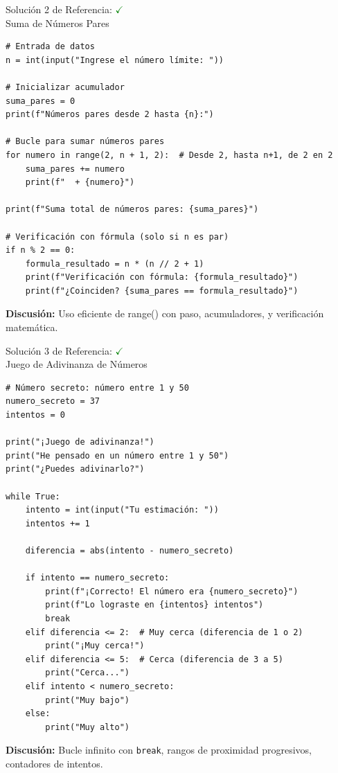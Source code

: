 \documentclass[10pt]{beamer}
\begin{document}
\begin{frame}[fragile]{Solución 2 de Referencia: \hfill \textcolor{green}{$\checkmark$} \\ Suma de Números Pares}
\begin{verbatim}
# Entrada de datos
n = int(input("Ingrese el número límite: "))

# Inicializar acumulador
suma_pares = 0
print(f"Números pares desde 2 hasta {n}:")

# Bucle para sumar números pares
for numero in range(2, n + 1, 2):  # Desde 2, hasta n+1, de 2 en 2
    suma_pares += numero
    print(f"  + {numero}")

print(f"Suma total de números pares: {suma_pares}")

# Verificación con fórmula (solo si n es par)
if n % 2 == 0:
    formula_resultado = n * (n // 2 + 1)
    print(f"Verificación con fórmula: {formula_resultado}")
    print(f"¿Coinciden? {suma_pares == formula_resultado}")
\end{verbatim}
\textbf{Discusión:} Uso eficiente de range() con paso, acumuladores, y verificación matemática.
\end{frame}

\begin{frame}[fragile]{Solución 3 de Referencia: \hfill \textcolor{green}{$\checkmark$} \\ Juego de Adivinanza de Números}
\begin{verbatim}
# Número secreto: número entre 1 y 50
numero_secreto = 37
intentos = 0

print("¡Juego de adivinanza!")
print("He pensado en un número entre 1 y 50")
print("¿Puedes adivinarlo?")

while True:
    intento = int(input("Tu estimación: "))
    intentos += 1

    diferencia = abs(intento - numero_secreto)

    if intento == numero_secreto:
        print(f"¡Correcto! El número era {numero_secreto}")
        print(f"Lo lograste en {intentos} intentos")
        break
    elif diferencia <= 2:  # Muy cerca (diferencia de 1 o 2)
        print("¡Muy cerca!")
    elif diferencia <= 5:  # Cerca (diferencia de 3 a 5)
        print("Cerca...")
    elif intento < numero_secreto:
        print("Muy bajo")
    else:
        print("Muy alto")
\end{verbatim}
\vspace{-0.4em}
{\scriptsize \textbf{Discusión:} Bucle infinito con \texttt{break}, rangos de proximidad progresivos, contadores de intentos.}
\end{frame}
\end{document}
